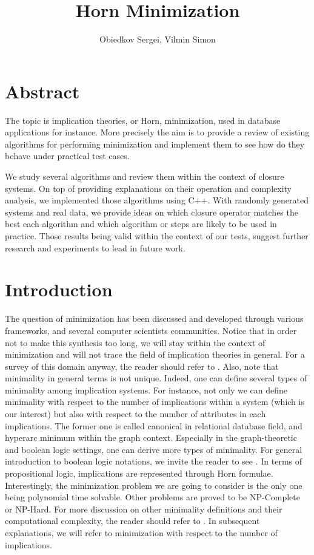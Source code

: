 \documentclass[a4paper, 10pt]{article}
\title{Horn Minimization}
\author{Obiedkov Sergei, Vilmin Simon}
\begin{document}
	
\maketitle
	
\section{Abstract}

The topic is implication theories, or Horn, minimization, used in database applications for instance. More precisely the aim is to provide a review of existing algorithms for performing minimization and implement them to see how do
they behave under practical test cases.

We study several algorithms and review them within the context of closure
systems. On top of providing explanations on their operation and complexity analysis, we implemented those algorithms using C++. With randomly generated systems and real data, we provide ideas on which closure operator matches the best each algorithm and which algorithm or steps are likely to be used in practice. Those results being valid within the context of our tests, suggest further research and experiments to lead in future work.
	
\section{Introduction}

The question of minimization has been discussed and developed through various 
frameworks, and several computer scientists communities. Notice that in order 
not to make this synthesis too long, we will stay within the context of 
minimization and will not trace the field of implication theories in general. 
For a survey of this domain anyway, the reader should refer to 
\cite{wild_joy_2017}. Also, note that minimality in general terms is not 
unique. Indeed, one can define several types of minimality among implication 
systems. For instance, not only we can define minimality with respect to the 
number of implications within a system (which is our interest) but also with 
respect to the number of attributes in each implications. The former one is 
called canonical in relational database field, and hyperarc 
minimum within the graph context. Especially in the graph-theoretic and 
boolean logic settings, one can derive more types of minimality. For general 
introduction to boolean logic notations, we invite the reader to see 
\cite{cori_mathematical_2000}. In terms of propositional logic, implications 
are represented through Horn formulae. Interestingly, the minimization problem 
we are going to consider is the only one being polynomial time solvable. Other 
problems are proved to be NP-Complete or NP-Hard. For more discussion on other 
minimality definitions and their computational complexity, the reader should 
refer to \cite{boros_strong_2017, ausiello_directed_2017, 
	ganter_conceptual_2016, ausiello_minimal_1986, wild_joy_2017, 
	boros_horn_1998, hammer_optimal_1993}. In subsequent explanations, we will refer to minimization with respect to the number of implications.
\end{document}
